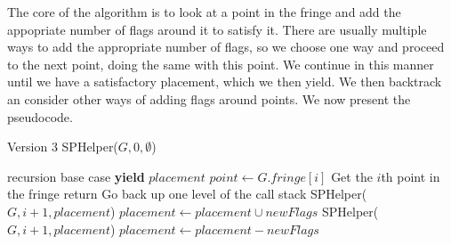 \documentclass{article}
\theoremstyle{definition}
\theoremstyle{definition}
\theoremstyle{theorem}
\begin{document}
	The core of the algorithm is to look at a point in the fringe and add the appopriate number of flags around it to satisfy it. There are usually multiple ways to add the appropriate number of flags, so we choose one  way and proceed to the next point, doing the same with this point. We continue in this manner until we have a satisfactory placement, which we then yield. We then backtrack an consider other ways of adding flags around points. We now present the pseudocode.
	
	\begin{algorithmic}
		 \Comment Version 3
		\State SPHelper($G,0, \emptyset$)
		\EndFunction
		
		 \Comment recursion base case
		\State \textbf{yield} $placement$
		\EndIf
		\State $point \gets G.fringe[i]$ \Comment Get the $i$th point in the fringe
		\State return \Comment Go back up one level of the call stack
		\State SPHelper($G, i+1, placement$)
		\Else
		\State $placement \gets placement \cup newFlags$
		\State SPHelper($G, i+1, placement$)
		\State $placement \gets placement - newFlags$
		\EndFor
		\EndIf
		
		\EndFunction
	\end{algorithmic}
\end{document}
